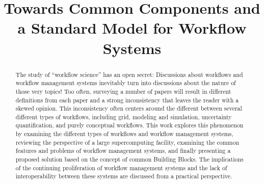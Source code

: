\documentclass[10pt,conference,final]{IEEEtran}
\begin{document}

\title{Towards Common Components and a Standard Model for Workflow Systems}


\author{  \and {}  }

\maketitle

\begin{abstract}

The study of ``workflow science'' has an open secret: Discussions about workflows and workflow management systems inevitably turn into discussions about the nature of those very topics! Too often, surveying a number of papers will result in different definitions from each paper and a strong inconsistency that leaves the reader with a skewed opinion. This inconsistency often centers around the different between several different types of workflows, including grid, modeling and simulation, uncertainty quantification, and purely conceptual workflows. This work explores this phenomenon by examining the different types of workflows and workflow management systems, reviewing the perspective of a large supercomputing facility, examining the common features and problems of workflow management systems, and finally presenting a proposed solution based on the concept of common Building Blocks. The implications of the continuing proliferation of workflow management systems and the lack of interoperability between these systems are discussed from a practical perspective.

\end{abstract}
\end{document}
